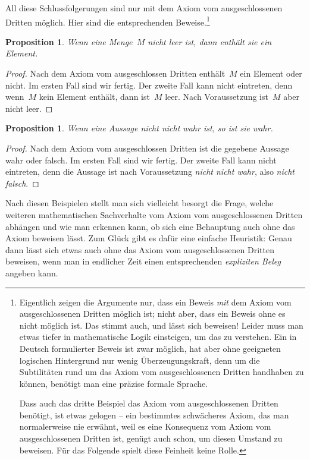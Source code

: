 \documentclass[twoside]{../zirkelblatt}
\theoremstyle{definition}
\theoremstyle{plain}
\newtheorem{prop}[defn]{Proposition}
\theoremstyle{remark}
\begin{document}
All diese Schlussfolgerungen sind nur mit dem Axiom vom ausgeschlossenen
Dritten möglich. Hier sind die entsprechenden Beweise.\footnote{Eigentlich
zeigen die Argumente nur, dass ein Beweis \emph{mit} dem
Axiom vom ausgeschlossenen Dritten möglich ist; nicht aber, dass ein Beweis
ohne es nicht möglich ist. Das stimmt auch, und lässt sich beweisen!
Leider muss man etwas tiefer in mathematische Logik einsteigen, um das zu
verstehen. Ein in Deutsch formulierter Beweis ist zwar möglich, hat aber ohne
geeigneten logischen Hintergrund nur wenig Überzeugungskraft, denn um die
Subtilitäten rund um das Axiom vom ausgeschlossenen Dritten handhaben zu
können, benötigt man eine präzise formale Sprache.

\noindent Dass auch das dritte Beispiel das Axiom vom ausgeschlossenen Dritten benötigt,
ist etwas gelogen -- ein bestimmtes schwächeres Axiom, das man normalerweise nie
erwähnt, weil es eine Konsequenz vom Axiom vom ausgeschlossenen Dritten ist,
genügt auch schon, um diesen Umstand zu beweisen. Für das Folgende spielt diese
Feinheit keine Rolle.}
\begin{prop}Wenn eine Menge~$M$ nicht leer ist, dann enthält sie ein Element.
\end{prop}
\begin{proof}
Nach dem Axiom vom ausgeschlossen Dritten enthält~$M$ ein Element oder nicht.
Im ersten Fall sind wir fertig. Der zweite Fall kann nicht eintreten, denn
wenn~$M$ kein Element enthält, dann ist~$M$ leer. Nach Voraussetzung
ist~$M$ aber nicht leer.
\end{proof}

\begin{prop}Wenn eine Aussage \emph{nicht nicht} wahr ist, so ist sie wahr.
\end{prop}
\begin{proof}Nach dem Axiom vom ausgeschlossen Dritten ist die gegebene Aussage wahr
oder falsch. Im ersten Fall sind wir fertig. Der zweite Fall kann nicht
eintreten, denn die Aussage ist nach Voraussetzung \emph{nicht nicht wahr}, also \emph{nicht
falsch}.
\end{proof}

Nach diesen Beispielen stellt man sich vielleicht besorgt die Frage, welche
weiteren mathematischen Sachverhalte vom Axiom vom ausgeschlossenen Dritten
abhängen und wie man erkennen kann, ob sich eine Behauptung auch ohne das Axiom
beweisen lässt. Zum Glück gibt es dafür eine einfache Heuristik: Genau dann
lässt sich etwas auch ohne das Axiom vom ausgeschlossenen Dritten beweisen,
wenn man in endlicher Zeit einen entsprechenden \emph{expliziten Beleg} angeben
kann.
\end{document}

